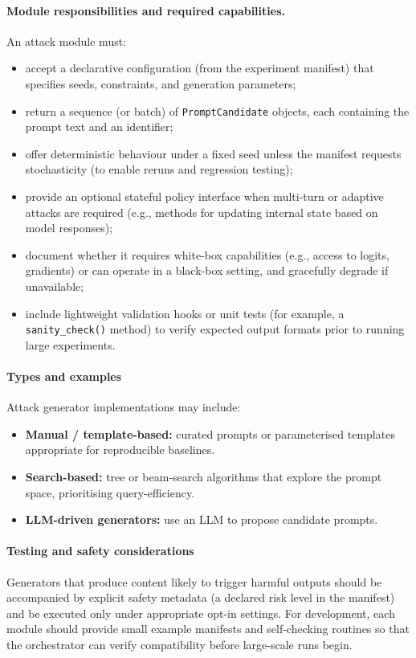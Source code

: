 \paragraph{Module responsibilities and required capabilities.}
An attack module must:
\begin{itemize}
  \item accept a declarative configuration (from the experiment manifest) that specifies seeds, constraints, and generation parameters;
  \item return a sequence (or batch) of \texttt{PromptCandidate} objects, each containing the prompt text and an identifier;
  \item offer deterministic behaviour under a fixed seed unless the manifest requests stochasticity (to enable reruns and regression testing);
  \item provide an optional stateful policy interface when multi-turn or adaptive attacks are required (e.g., methods for updating internal state based on model responses);
  \item document whether it requires white-box capabilities (e.g., access to logits, gradients) or can operate in a black-box setting, and gracefully degrade if unavailable;
  \item include lightweight validation hooks or unit tests (for example, a \texttt{sanity\_check()} method) to verify expected output formats prior to running large experiments.
\end{itemize}

\paragraph{Types and examples}
Attack generator implementations may include:
\begin{itemize}
  \item \textbf{Manual / template-based:} curated prompts or parameterised templates appropriate for reproducible baselines.
  \item \textbf{Search-based:} tree or beam-search algorithms that explore the prompt space, prioritising query-efficiency.
  \item \textbf{LLM-driven generators:} use an LLM to propose candidate prompts.
\end{itemize}

\paragraph{Testing and safety considerations}
Generators that produce content likely to trigger harmful outputs should be accompanied by explicit safety metadata (a declared risk level in the manifest) and be executed only under appropriate opt-in settings. For development, each module should provide small example manifests and self-checking routines so that the orchestrator can verify compatibility before large-scale runs begin.

